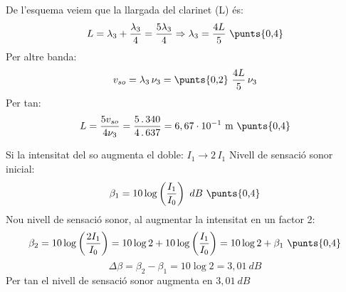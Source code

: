 \begin{solapartat}
De l'esquema veiem que la llargada del clarinet (L) és:
\[ L = \lambda_3 + \frac{\lambda_3}{4} = \frac{5\lambda_3}{4} \Rightarrow \lambda_3 = \frac{4L}{5} \ \text{\punts{0,4}} \]
Per altre banda:
\[ v_{so} = \lambda_3\,\nu_3 = \text{\punts{0,2}}\ \frac{4L}{5}\,\nu_3 \]
Per tan:
\[ L = \frac{5v_{so}}{4\nu_3} = \frac{5\,.\,340}{4\,.\,637} = 6,67\cdot 10^{-1}\ \mathrm{m} \ \text{\punts{0,4}} \]
\end{solapartat}

\begin{solapartat}
Si la intensitat del so augmenta el doble: $I_1 \to 2\,I_1$ Nivell de sensació sonor inicial:
\[ \beta_1 = 10\log\left(\frac{I_1}{I_0}\right)\ dB \ \text{\punts{0,4}} \]
Nou nivell de sensació sonor, al augmentar la intensitat en un factor 2:
\[ \beta_2 = 10\log\left(\frac{2I_1}{I_0}\right) = 10\log 2 + 10\log\left(\frac{I_1}{I_0}\right) = 10\log 2 + \beta_1 \ \text{\punts{0,4}} \]
\[ \Delta\beta = \beta_2 - \beta_1 = 10\log 2 = 3,01\ dB \]
Per tan el nivell de sensació sonor augmenta en $3,01\ dB$ 
\end{solapartat}
